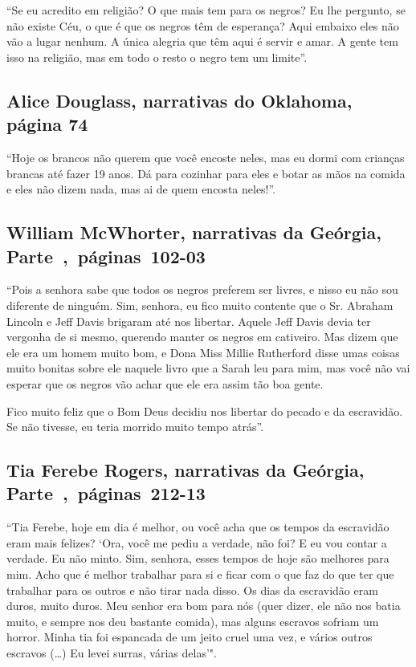 ``Se eu acredito em religião? O que mais tem para os negros? Eu lhe
pergunto, se não existe Céu, o que é que os negros têm de esperança?
Aqui embaixo eles não vão a lugar nenhum. A única alegria que têm aqui é
servir e amar. A gente tem isso na religião, mas em todo o resto o negro
tem um limite''.

\subsection{Alice Douglass, narrativas do Oklahoma, página 74} \label{ref74}

``Hoje os brancos não querem que você encoste neles, mas eu dormi com
crianças brancas até fazer 19 anos. Dá para cozinhar para eles e botar
as mãos na comida e eles não dizem nada, mas ai de quem encosta neles!''.

\subsection{William McWhorter, narrativas da Geórgia, Parte~,~páginas~102-03}
\label{ref191}

``Pois a senhora sabe que todos os negros preferem ser livres, e nisso
eu não sou diferente de ninguém. Sim, senhora, eu fico muito contente
que o Sr. Abraham Lincoln e Jeff Davis brigaram até nos libertar. Aquele
Jeff Davis devia ter vergonha de si mesmo, querendo manter os negros em
cativeiro. Mas dizem que ele era um homem muito bom, e Dona Miss Millie
Rutherford disse umas coisas muito bonitas sobre ele naquele livro que a
Sarah leu para mim, mas você não vai esperar que os negros vão achar que
ele era assim tão boa gente.

Fico muito feliz que o Bom Deus decidiu nos libertar do pecado e da
escravidão. Se não tivesse, eu teria morrido muito tempo atrás''.

\subsection{Tia Ferebe Rogers, narrativas da Geórgia, Parte~,~páginas~212-13}
\label{ref228}

``Tia Ferebe, hoje em dia é melhor, ou você acha que os tempos da
escravidão eram mais felizes? `Ora, você me pediu a verdade, não foi? E
eu vou contar a verdade. Eu não minto. Sim, senhora, esses tempos de
hoje são melhores para mim. Acho que é melhor trabalhar para si e ficar
com o que faz do que ter que trabalhar para os outros e não tirar nada
disso. Os dias da escravidão eram duros, muito duros. Meu senhor era bom
para nós (quer dizer, ele não nos batia muito, e sempre nos deu bastante
comida), mas alguns escravos sofriam um horror. Minha tia foi espancada
de um jeito cruel uma vez, e vários outros escravos (\ldots{}) Eu levei
surras, várias delas'".

